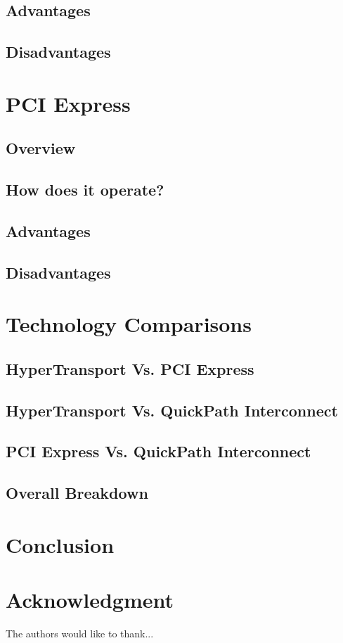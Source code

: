 \documentclass[conference]{IEEEtran}
\begin{document}
\subsection{Advantages}
\label{subsec:ht:advant}

\subsection{Disadvantages}
\label{subsec:ht:disadv}

\section{PCI Express}
\subsection{Overview}
\subsection{How does it operate?}
\subsection{Advantages}
\subsection{Disadvantages}

\section{Technology Comparisons}
\subsection{HyperTransport Vs. PCI Express}

\subsection{HyperTransport Vs. QuickPath Interconnect}


\subsection{PCI Express Vs. QuickPath Interconnect}

\subsection{Overall Breakdown}

\section{Conclusion}

\section*{Acknowledgment}
The authors would like to thank...



\end{document}
